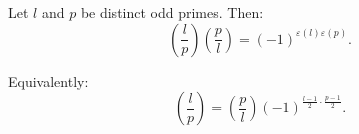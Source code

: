 Let $l$ and $p$ be distinct odd primes. Then:
$$\left(\frac{l}{p}\right)\left(\frac{p}{l}\right) = (-1)^{\varepsilon(l)\varepsilon(p)}.$$

Equivalently:
$$\left(\frac{l}{p}\right) = \left(\frac{p}{l}\right)(-1)^{\frac{l-1}{2} \cdot \frac{p-1}{2}}.$$
